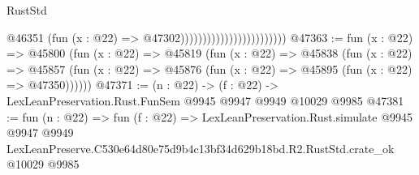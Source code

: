 \begin{lexlean}{RustStd}
\begin{coremodule}
                                                @46351
                                                  (fun (x : @22) => @47302))))))))))))))))))))))))
@47363 := fun (x : @22) =>
  @45800
    (fun (x : @22) =>
    @45819
      (fun (x : @22) =>
      @45838
        (fun (x : @22) =>
        @45857 (fun (x : @22) => @45876 (fun (x : @22) => @45895 (fun (x : @22) => @47350))))))
@47371 := (n : @22) -> (f : @22) -> LexLeanPreservation.Rust.FunSem @9945 @9947 @9949 @10029 @9985
@47381 := fun (n : @22) =>
  fun (f : @22) =>
  LexLeanPreservation.Rust.simulate
    @9945
    @9947
    @9949
    LexLeanPreserve.C530e64d80e75d9b4c13bf34d629b18bd.R2.RustStd.crate_ok
    @10029
    @9985
\end{coremodule}
\end{lexlean}
